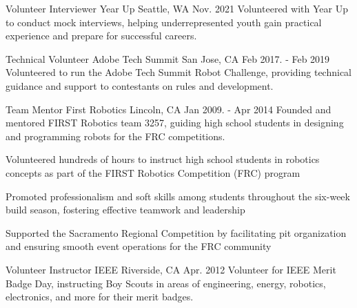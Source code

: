 

\begin{cventries}

  \cventry
    {Volunteer Interviewer} %
    {Year Up} %
    {Seattle, WA} %
    {Nov. 2021} %
    {Volunteered with Year Up to conduct mock interviews, helping underrepresented youth gain practical experience and prepare for successful careers.} %
    {}

  \cventry
    {Technical Volunteer} %
    {Adobe Tech Summit} %
    {San Jose, CA} %
    {Feb 2017. - Feb 2019} %
    {Volunteered to run the Adobe Tech Summit Robot Challenge, providing technical guidance and support to contestants on rules and development.} %
    {}

  \cventry
    {Team Mentor} %
    {First Robotics} %
    {Lincoln, CA} %
    {Jan 2009. - Apr 2014} %
    {Founded and mentored FIRST Robotics team 3257, guiding high school students in designing and programming robots for the FRC competitions.} %
    {
        \begin{cvitems} %
            \item {Volunteered hundreds of hours to instruct high school students in robotics concepts as part of the FIRST Robotics Competition (FRC) program}
            \item {Promoted professionalism and soft skills among students throughout the six-week build season, fostering effective teamwork and leadership}
            \item {Supported the Sacramento Regional Competition by facilitating pit organization and ensuring smooth event operations for the FRC community}
        \end{cvitems}
    }

  \cventry
    {Volunteer Instructor} %
    {IEEE} %
    {Riverside, CA} %
    {Apr. 2012} %
    {Volunteer for IEEE Merit Badge Day, instructing Boy Scouts in areas of engineering, energy, robotics, electronics, and more for their merit badges.} %
    {}

\end{cventries}
